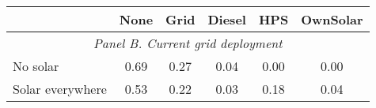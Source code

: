 \begin{table}[htbp]\centering
\begin{tabular}{l*{5}{c}}
\toprule
                 &        None&        Grid&      Diesel&         HPS&    OwnSolar\\
\midrule

\multicolumn{6}{c}{\emph{Panel B. Current grid deployment}} \\
No solar         &  \cellcolor{yellow} 0.69&        0.27&        0.04&     \cellcolor{yellow} 0.00&   \cellcolor{yellow} 0.00\\
Solar everywhere &    \cellcolor{yellow}    0.53&        0.22&        0.03&    \cellcolor{yellow}    0.18&       \cellcolor{yellow} 0.04\\


\bottomrule
\end{tabular}
\end{table}